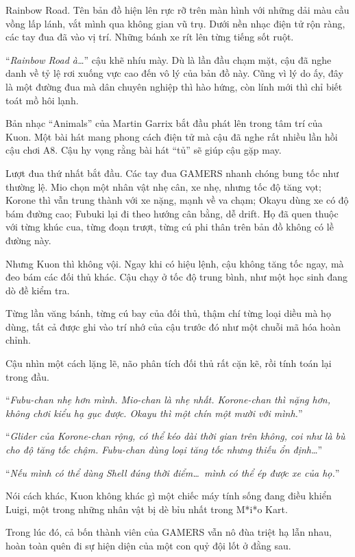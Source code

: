 \documentclass[../main.tex]{subfiles}
\begin{document}
\ct

Rainbow Road. Tên bản đồ hiện lên rực rỡ trên màn hình với những dải màu cầu vồng lấp lánh, vắt mình qua không gian vũ trụ. Dưới nền nhạc điện tử rộn ràng, các tay đua đã vào vị trí. Những bánh xe rít lên từng tiếng sốt ruột.

``\textit{Rainbow Road à\dots}'' cậu khẽ nhíu mày. Dù là lần đầu chạm mặt, cậu đã nghe danh về tỷ lệ rơi xuống vực cao đến vô lý của bản đồ này. Cũng vì lý do ấy, đây là một đường đua mà dân chuyên nghiệp thì hào hứng, còn lính mới thì chỉ biết toát mồ hôi lạnh.

Bản nhạc ``Animals'' của Martin Garrix bắt đầu phát lên trong tâm trí của Kuon. Một bài hát mang phong cách điện tử mà cậu đã nghe rất nhiều lần hồi cậu chơi A8. Cậu hy vọng rằng bài hát ``tủ'' sẽ giúp cậu gặp may.

Lượt đua thứ nhất bắt đầu. Các tay đua GAMERS nhanh chóng bung tốc như thường lệ. Mio chọn một nhân vật nhẹ cân, xe nhẹ, nhưng tốc độ tăng vọt; Korone thì vẫn trung thành với xe nặng, mạnh về va chạm; Okayu dùng xe có độ bám đường cao; Fubuki lại đi theo hướng cân bằng, dễ drift. Họ đã quen thuộc với từng khúc cua, từng đoạn trượt, từng cú phi thân trên bản đồ không có lề đường này.

Nhưng Kuon thì không vội. Ngay khi có hiệu lệnh, cậu không tăng tốc ngay, mà đeo bám các đối thủ khác. Cậu chạy ở tốc độ trung bình, như một học sinh đang dò đề kiểm tra.

Từng lần văng bánh, từng cú bay của đối thủ, thậm chí từng loại diều mà họ dùng, tất cả được ghi vào trí nhớ của cậu trước đó như một chuỗi mã hóa hoàn chỉnh.

Cậu nhìn một cách lặng lẽ, não phân tích đối thủ rất cặn kẽ, rồi tính toán lại trong đầu.

``\textit{Fubu-chan nhẹ hơn mình. Mio-chan là nhẹ nhất. Korone-chan thì nặng hơn, không chơi kiểu hạ gục được. Okayu thì một chín một mười với mình.}''

``\textit{Glider của Korone-chan rộng, có thể kéo dài thời gian trên không, coi như là bù cho độ tăng tốc chậm. Fubu-chan dùng loại tăng tốc nhưng thiếu ổn định\dots}''

``\textit{Nếu mình có thể dùng Shell đúng thời điểm\dots\ mình có thể ép được xe của họ.}''

Nói cách khác, Kuon không khác gì một chiếc máy tính sống đang điều khiển Luigi, một trong những nhân vật bị dè bỉu nhất trong M*i*o Kart.

Trong lúc đó, cả bốn thành viên của GAMERS vẫn nô đùa triệt hạ lẫn nhau, hoàn toàn quên đi sự hiện diện của một con quỷ đội lốt ở đằng sau.
\end{document}

